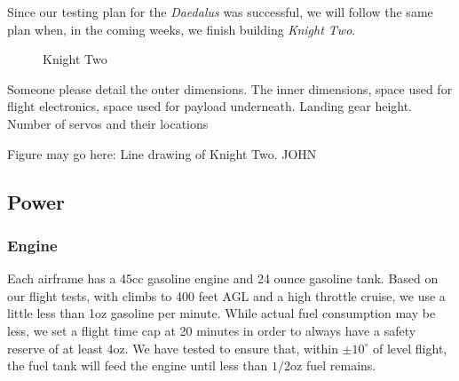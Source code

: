 \documentclass[10pt]{report}
\newcommand{\degrees}[1]
{
\begin{math}
#1^{\circ} 
\end{math}
}
\begin{document}
Since our testing plan for the \emph{Daedalus} was successful, we will follow the same plan when, in the coming weeks, we finish building \emph{Knight Two}.

\begin{figure}
	\centering
  	\label{fig:knighttwo}
  	\caption[Knight Two]{Knight Two}
\end{figure}
Someone please detail the outer dimensions. The inner dimensions, space used for flight electronics, space used for payload underneath. Landing gear height. Number of servos and their locations

Figure may go here: Line drawing of Knight Two. JOHN

\subsection{Power}

\subsubsection{Engine}

Each airframe has a 45cc gasoline engine and 24 ounce gasoline tank. Based on our flight tests, with climbs to 400 feet AGL and a high throttle cruise, we use a little less than 1oz gasoline per minute. While actual fuel consumption may be less, we set a flight time cap at 20 minutes in order to always have a safety reserve of at least 4oz. We have tested to ensure that, within \degrees{\pm10} of level flight, the fuel tank will feed the engine until less than $1/2$oz fuel remains.
\end{document}
